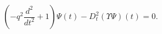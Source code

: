 \begin{equation}
\label{Psi1} \left(-q^2\frac{d^2}{dt^2}+1\right)\Psi(t)
-D^2_t\left( \Upsilon \Psi\right)(t)=0.
\end{equation}

